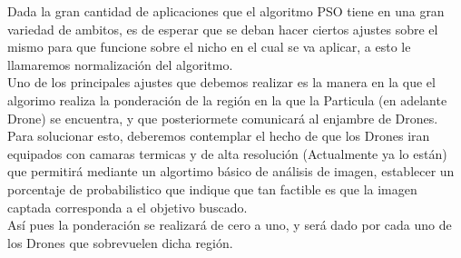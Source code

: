\documentclass[journal]{IEEEtran}
\begin{document}
Dada la gran cantidad de aplicaciones que el algoritmo PSO tiene en una gran variedad de ambitos, es de esperar que se deban hacer ciertos ajustes sobre el mismo para que funcione sobre el nicho en el cual se va aplicar, a esto le llamaremos normalización del algoritmo.\\

Uno de los principales ajustes que debemos realizar es la manera en la que el algorimo realiza la ponderación de la región en la que la Particula (en adelante Drone) se encuentra, y que posteriormete comunicará al enjambre de Drones.\\

Para solucionar esto, deberemos contemplar el hecho de que los Drones iran equipados con camaras termicas y de alta resolución (Actualmente ya lo están) que permitirá mediante un algortimo básico de análisis de imagen, establecer un porcentaje de probabilistico que indique que tan factible es que la imagen captada corresponda a el objetivo buscado.\\

Así pues la ponderación se realizará de cero a uno, y será dado por cada uno de los Drones que sobrevuelen dicha región.\\
\end{document}
